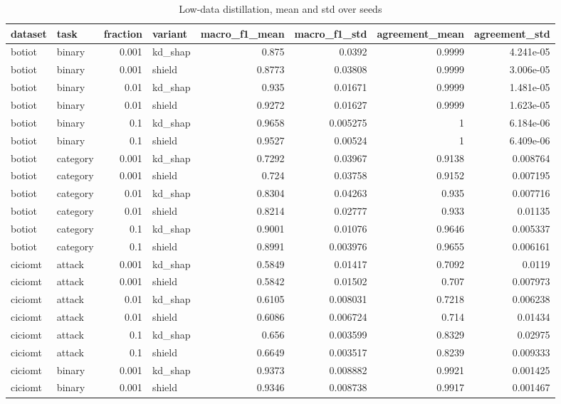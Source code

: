 \begin{table}
\caption{Low-data distillation, mean and std over seeds}
\begin{tabular}{llrlrrrr}
\toprule
dataset & task & fraction & variant & macro_f1_mean & macro_f1_std & agreement_mean & agreement_std \\
\midrule
botiot & binary & 0.001 & kd_shap & 0.875 & 0.0392 & 0.9999 & 4.241e-05 \\
botiot & binary & 0.001 & shield & 0.8773 & 0.03808 & 0.9999 & 3.006e-05 \\
botiot & binary & 0.01 & kd_shap & 0.935 & 0.01671 & 0.9999 & 1.481e-05 \\
botiot & binary & 0.01 & shield & 0.9272 & 0.01627 & 0.9999 & 1.623e-05 \\
botiot & binary & 0.1 & kd_shap & 0.9658 & 0.005275 & 1 & 6.184e-06 \\
botiot & binary & 0.1 & shield & 0.9527 & 0.00524 & 1 & 6.409e-06 \\
botiot & category & 0.001 & kd_shap & 0.7292 & 0.03967 & 0.9138 & 0.008764 \\
botiot & category & 0.001 & shield & 0.724 & 0.03758 & 0.9152 & 0.007195 \\
botiot & category & 0.01 & kd_shap & 0.8304 & 0.04263 & 0.935 & 0.007716 \\
botiot & category & 0.01 & shield & 0.8214 & 0.02777 & 0.933 & 0.01135 \\
botiot & category & 0.1 & kd_shap & 0.9001 & 0.01076 & 0.9646 & 0.005337 \\
botiot & category & 0.1 & shield & 0.8991 & 0.003976 & 0.9655 & 0.006161 \\
ciciomt & attack & 0.001 & kd_shap & 0.5849 & 0.01417 & 0.7092 & 0.0119 \\
ciciomt & attack & 0.001 & shield & 0.5842 & 0.01502 & 0.707 & 0.007973 \\
ciciomt & attack & 0.01 & kd_shap & 0.6105 & 0.008031 & 0.7218 & 0.006238 \\
ciciomt & attack & 0.01 & shield & 0.6086 & 0.006724 & 0.714 & 0.01434 \\
ciciomt & attack & 0.1 & kd_shap & 0.656 & 0.003599 & 0.8329 & 0.02975 \\
ciciomt & attack & 0.1 & shield & 0.6649 & 0.003517 & 0.8239 & 0.009333 \\
ciciomt & binary & 0.001 & kd_shap & 0.9373 & 0.008882 & 0.9921 & 0.001425 \\
ciciomt & binary & 0.001 & shield & 0.9346 & 0.008738 & 0.9917 & 0.001467 \\

\end{tabular}
\end{table}
